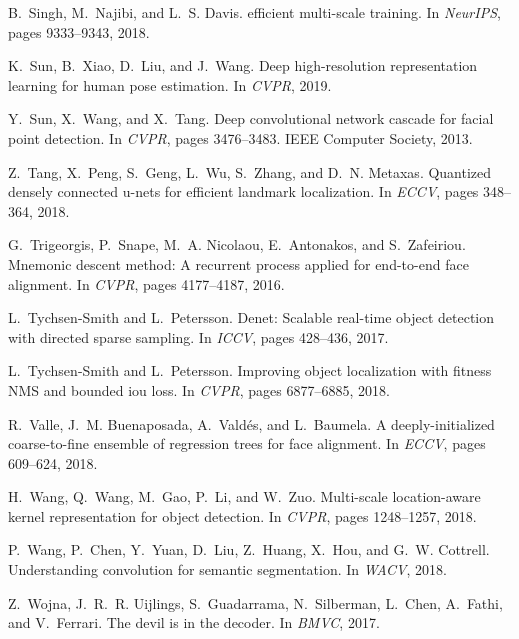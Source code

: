 \documentclass[10pt,twocolumn,letterpaper]{article}
\begin{document}
{\begin{thebibliography}{100}
B.~Singh, M.~Najibi, and L.~S. Davis.
 efficient multi-scale training.
\newblock In {\em {NeurIPS}}, pages 9333--9343, 2018.

K.~Sun, B.~Xiao, D.~Liu, and J.~Wang.
\newblock Deep high-resolution representation learning for human pose
  estimation.
\newblock In {\em {CVPR}}, 2019.

Y.~Sun, X.~Wang, and X.~Tang.
\newblock Deep convolutional network cascade for facial point detection.
\newblock In {\em {CVPR}}, pages 3476--3483. {IEEE} Computer Society, 2013.

Z.~Tang, X.~Peng, S.~Geng, L.~Wu, S.~Zhang, and D.~N. Metaxas.
\newblock Quantized densely connected u-nets for efficient landmark
  localization.
\newblock In {\em {ECCV}}, pages 348--364, 2018.

G.~Trigeorgis, P.~Snape, M.~A. Nicolaou, E.~Antonakos, and S.~Zafeiriou.
\newblock Mnemonic descent method: {A} recurrent process applied for end-to-end
  face alignment.
\newblock In {\em {CVPR}}, pages 4177--4187, 2016.

L.~Tychsen{-}Smith and L.~Petersson.
\newblock Denet: Scalable real-time object detection with directed sparse
  sampling.
\newblock In {\em {ICCV}}, pages 428--436, 2017.

L.~Tychsen{-}Smith and L.~Petersson.
\newblock Improving object localization with fitness {NMS} and bounded iou
  loss.
\newblock In {\em {CVPR}}, pages 6877--6885, 2018.

R.~Valle, J.~M. Buenaposada, A.~Vald{\'{e}}s, and L.~Baumela.
\newblock A deeply-initialized coarse-to-fine ensemble of regression trees for
  face alignment.
\newblock In {\em {ECCV}}, pages 609--624, 2018.

H.~Wang, Q.~Wang, M.~Gao, P.~Li, and W.~Zuo.
\newblock Multi-scale location-aware kernel representation for object
  detection.
\newblock In {\em {CVPR}}, pages 1248--1257, 2018.

P.~Wang, P.~Chen, Y.~Yuan, D.~Liu, Z.~Huang, X.~Hou, and G.~W. Cottrell.
\newblock Understanding convolution for semantic segmentation.
\newblock In {\em {WACV}}, 2018.

Z.~Wojna, J.~R.~R. Uijlings, S.~Guadarrama, N.~Silberman, L.~Chen, A.~Fathi,
  and V.~Ferrari.
\newblock The devil is in the decoder.
\newblock In {\em {BMVC}}, 2017.


\end{thebibliography}}
\end{document}
